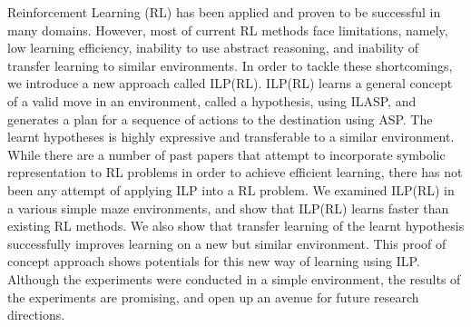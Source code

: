 Reinforcement Learning (RL) has been applied and proven to be successful in many domains.
However, most of current RL methods face limitations, namely, low learning efficiency, 
inability to use abstract reasoning, and inability of transfer learning to similar environments.
In order to tackle these shortcomings, we introduce a new approach called ILP(RL).
ILP(RL) learns a general concept of a valid move in an environment, called a hypothesis, using ILASP, and generates a plan for a sequence of actions to the destination using ASP.
The learnt hypotheses is highly expressive and transferable to a similar environment. 
While there are a number of past papers that attempt to incorporate symbolic representation to RL problems in order to achieve efficient learning, 
there has not been any attempt of applying ILP into a RL problem.
We examined ILP(RL) in a various simple maze environments, and show that ILP(RL) learns faster than existing RL methods.
We also show that transfer learning of the learnt hypothesis successfully improves learning on a new but similar environment.
This proof of concept approach shows potentials for this new way of learning using ILP.
Although the experiments were conducted in a simple environment, the results of the experiments are promising, and open up an avenue for future research directions.
